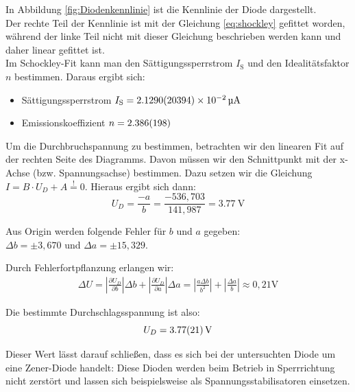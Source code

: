 \documentclass[12pt,a4paper,ngerman]{report}
\begin{document}
		In Abbildung \ref{fig:Diodenkennlinie} ist die Kennlinie der Diode dargestellt. \\ 
		Der rechte Teil der Kennlinie ist mit der Gleichung \ref{eq:shockley} gefittet worden, während der linke Teil nicht mit dieser Gleichung beschrieben werden kann und daher linear gefittet ist. \\

		Im Schockley-Fit kann man den Sättigungssperrstrom $I_\text{S}$ und den Idealitätsfaktor $n$ bestimmen. Daraus ergibt sich:
		\begin{itemize}
			\item Sättigungssperrstrom $I_\text{S} = \SI{2,129 +- 2,0394 e-2}{\micro\ampere}$
			\item Emissionskoeffizient $n = \num{2,386 +- 0,198} $
		\end{itemize}

		Um die Durchbruchspannung zu bestimmen, betrachten wir den linearen Fit auf der rechten Seite des Diagramms. Davon müssen wir den Schnittpunkt mit der x-Achse (bzw. Spannungsachse) bestimmen.
		Dazu setzen wir die Gleichung\\
		$I=B \cdot U_D + A \stackrel{!}{=} 0$. Hieraus ergibt sich dann:
		$$U_D = \frac{-a}{b}  = \frac{-536,703}{141,987} = \qty{3,77}{\volt}$$

		Aus Origin werden folgende Fehler für $b$ und $a$ gegeben:\\ $\Delta b = \pm 3,670 $ und $\Delta a = \pm 15,329$.

		Durch Fehlerfortpflanzung erlangen wir:
		\begin{eqnarray}
			\Delta U =\left|\frac{\partial U_D}{\partial b}\right| \Delta b + \left|\frac{\partial U_D}{\partial a}\right|\Delta a = \left|\frac{a\Delta b}{b^2}\right|  + \left|\frac{\Delta a}{b}\right| \approx 0,21 \mathrm{V}
		\end{eqnarray}


		Die bestimmte Durchschlagsspannung ist also:
			\[ U_D = \qty{3,77 +- 0,21}{\volt}\]

		Dieser Wert lässt darauf schließen, dass es sich bei der untersuchten Diode um eine Zener-Diode handelt: Diese Dioden werden beim Betrieb in Sperrrichtung nicht zerstört und
		lassen sich beispielsweise als Spannungsstabilisatoren einsetzen.

		
\end{document}
